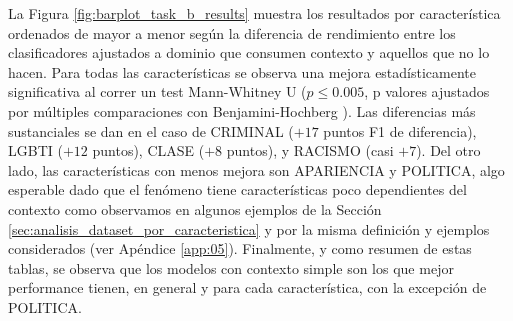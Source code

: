 La Figura \ref{fig:barplot_task_b_results} muestra los resultados por característica ordenados de mayor a menor según la diferencia de rendimiento entre los clasificadores ajustados a dominio que consumen contexto y aquellos que no lo hacen. Para todas las características se observa una mejora estadísticamente significativa al correr un test Mann-Whitney U ($p \leq 0.005$, p valores ajustados por múltiples comparaciones con Benjamini-Hochberg \cite{benjamini1995controlling}). Las diferencias más sustanciales se dan en el caso de CRIMINAL ($+17$ puntos F1 de diferencia), LGBTI ($+12$ puntos), CLASE ($+8$ puntos), y RACISMO (casi $+7$). Del otro lado, las características con menos mejora son APARIENCIA y POLITICA, algo esperable dado que el fenómeno tiene características poco dependientes del contexto como observamos en algunos ejemplos de la Sección \ref{sec:analisis_dataset_por_caracteristica} y por la misma definición y ejemplos considerados (ver Apéndice \ref{app:05}). Finalmente, y como resumen de estas tablas, se observa que los modelos con contexto simple son los que mejor performance tienen, en general y para cada característica, con la excepción de POLITICA.



